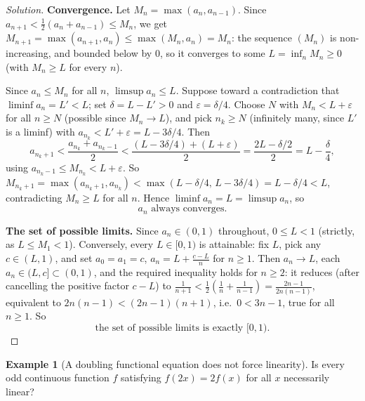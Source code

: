 \documentclass[11pt]{article}
\theoremstyle{definition}
\newtheorem{example}{Example}[section]
\begin{document}
\begin{proof}[Solution]
\textbf{Convergence.} Let $M_n=\max(a_n,a_{n-1})$. Since $a_{n+1}<\tfrac12(a_n+a_{n-1})\le M_n$, we get $M_{n+1}=\max(a_{n+1},a_n)\le\max(M_n,a_n)=M_n$: the sequence $(M_n)$ is non-increasing, and bounded below by $0$, so it converges to some $L=\inf_n M_n\ge0$ (with $M_n\ge L$ for every $n$).

Since $a_n\le M_n$ for all $n$, $\limsup a_n\le L$. Suppose toward a contradiction that $\liminf a_n=L'<L$; set $\delta=L-L'>0$ and $\varepsilon=\delta/4$. Choose $N$ with $M_n<L+\varepsilon$ for all $n\ge N$ (possible since $M_n\to L$), and pick $n_k\ge N$ (infinitely many, since $L'$ is a liminf) with $a_{n_k}<L'+\varepsilon=L-3\delta/4$. Then
\[
a_{n_k+1}<\frac{a_{n_k}+a_{n_k-1}}{2}<\frac{(L-3\delta/4)+(L+\varepsilon)}{2}=\frac{2L-\delta/2}{2}=L-\frac\delta4,
\]
using $a_{n_k-1}\le M_{n_k}<L+\varepsilon$. So $M_{n_k+1}=\max(a_{n_k+1},a_{n_k})<\max(L-\delta/4,\,L-3\delta/4)=L-\delta/4<L$, contradicting $M_n\ge L$ for all $n$. Hence $\liminf a_n=L=\limsup a_n$, so
\[
\boxed{a_n \text{ always converges}}.
\]

\textbf{The set of possible limits.} Since $a_n\in(0,1)$ throughout, $0\le L<1$ (strictly, as $L\le M_1<1$). Conversely, every $L\in[0,1)$ is attainable: fix $L$, pick any $c\in(L,1)$, and set $a_0=a_1=c$, $a_n=L+\tfrac{c-L}{n}$ for $n\ge1$. Then $a_n\to L$, each $a_n\in(L,c]\subset(0,1)$, and the required inequality holds for $n\ge2$: it reduces (after cancelling the positive factor $c-L$) to $\tfrac1{n+1}<\tfrac12\left(\tfrac1n+\tfrac1{n-1}\right)=\tfrac{2n-1}{2n(n-1)}$, equivalent to $2n(n-1)<(2n-1)(n+1)$, i.e.\ $0<3n-1$, true for all $n\ge1$. So
\[
\boxed{\text{the set of possible limits is exactly } [0,1)}.
\]
\end{proof}

\begin{example}[A doubling functional equation does not force linearity]
Is every odd continuous function $f$ satisfying $f(2x)=2f(x)$ for all $x$ necessarily linear?
\end{example}
\end{document}
